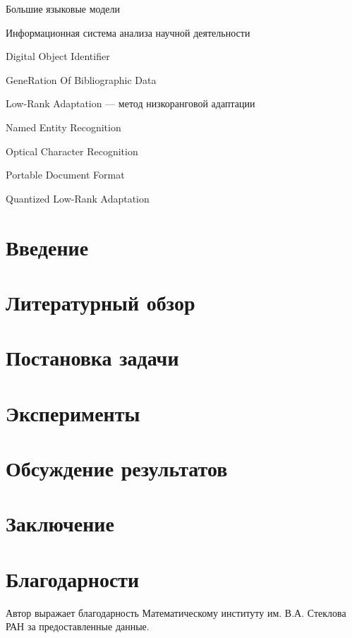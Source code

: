 \documentclass{mipt-thesis-ms}
\begin{document}
\begin{description}[leftmargin=2.5cm, style=nextline]
    \item[БЯМ] Большие языковые модели
    \item[ИСАНД] Информационная система анализа научной деятельности
    \item[DOI] Digital Object Identifier
    \item[GROBID] GeneRation Of Bibliographic Data
    \item[LoRA] Low-Rank Adaptation — метод низкоранговой адаптации
    \item[NER] Named Entity Recognition
    \item[OCR] Optical Character Recognition
    \item[PDF] Portable Document Format
    \item[QLoRA] Quantized Low-Rank Adaptation
\end{description}

\chapter{Введение}



\chapter{Литературный обзор} 



\chapter{Постановка задачи}



\chapter{Эксперименты}



\chapter{Обсуждение результатов}



\chapter{Заключение}



\chapter*{Благодарности}

Автор выражает благодарность Математическому институту им. В.А. Стеклова РАН за предоставленные данные.

\backmatter

\printbib
\end{document}
